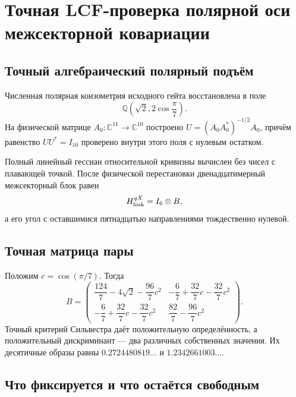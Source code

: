 \chapter{Точная LCF-проверка полярной оси межсекторной ковариации}
\label{ch:v8-cross-arrow-covariance-lcf-migration-gate}

\section{Точный алгебраический полярный подъём}

Численная полярная коизометрия исходного гейта восстановлена в поле
\begin{equation}
 \mathbb Q\!\left(\sqrt2,2\cos\frac\pi7\right).
\end{equation}
На физической матрице $A_0:\mathbb C^{11}\to\mathbb C^{10}$ построено
$U=(A_0A_0^*)^{-1/2}A_0$, причём равенство $UU^*=I_{10}$ проверено внутри
этого поля с нулевым остатком.

Полный линейный гессиан относительной кривизны вычислен без чисел с
плавающей точкой. После физической перестановки двенадцатимерный межсекторный блок
равен
\begin{equation}
 H_{\rm link}^{qX}=I_6\otimes B,
 \label{eq:v8-lcf-cross-six-pairs}
\end{equation}
а его угол с оставшимися пятнадцатью направлениями тождественно нулевой.

\section{Точная матрица пары}

Положим $c=\cos(\pi/7)$. Тогда
\begin{equation}
 B=\begin{pmatrix}
 \dfrac{124}{7}-4\sqrt2-\dfrac{96}{7}c^2&
 -\dfrac67+\dfrac{32}{7}c-\dfrac{32}{7}c^2\\[2mm]
 -\dfrac67+\dfrac{32}{7}c-\dfrac{32}{7}c^2&
 \dfrac{82}{7}-\dfrac{96}{7}c^2
 \end{pmatrix}.
 \label{eq:v8-lcf-exact-cross-pair}
\end{equation}
Точный критерий Сильвестра даёт положительную определённость, а положительный
дискриминант --- два различных собственных значения. Их десятичные образы
равны $0.2724480819\ldots$ и $1.2342661003\ldots$.

\section{Что фиксируется и что остаётся свободным}

